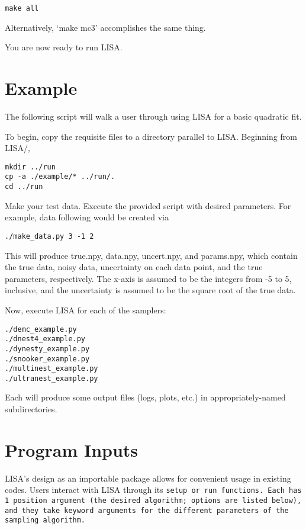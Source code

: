 \documentclass[letterpaper, 12pt]{article}
\begin{document}
\begin{verbatim}
make all
\end{verbatim}

\noindent Alternatively, `make mc3' accomplishes the same thing.\newline

\noindent You are now ready to run LISA.


\section{Example}
\label{sec:example}

The following script will walk a user through using LISA for a basic quadratic 
fit.

\noindent To begin, copy the requisite files to a directory parallel to LISA. 
Beginning from LISA/, 
\begin{verbatim}
mkdir ../run
cp -a ./example/* ../run/.
cd ../run
\end{verbatim}

\noindent Make your test data.  Execute the provided script with 
desired parameters.  For example, data following  
would be created via
\begin{verbatim}
./make_data.py 3 -1 2
\end{verbatim}
\noindent This will produce true.npy, data.npy, uncert.npy, and params.npy, 
which contain the true data, noisy data, uncertainty on each data point, and 
the true parameters, respectively.  The x-axis is assumed to be the integers 
from -5 to 5, inclusive, and the uncertainty is assumed to be the square root 
of the true data.\newline

\noindent Now, execute LISA for each of the samplers:

\begin{verbatim}
./demc_example.py
./dnest4_example.py
./dynesty_example.py
./snooker_example.py
./multinest_example.py
./ultranest_example.py
\end{verbatim}

\noindent Each will produce some output files (logs, plots, etc.) in 
appropriately-named subdirectories.


\section{Program Inputs}
\label{sec:inputs}

LISA's design as an importable package allows for convenient usage in existing 
codes.  Users interact with LISA through its \tt{setup} or \tt{run} functions. 
Each has 1 position argument (the desired algorithm; options are listed below), 
and they take keyword arguments for the different parameters of the sampling 
algorithm.  
\end{document}
